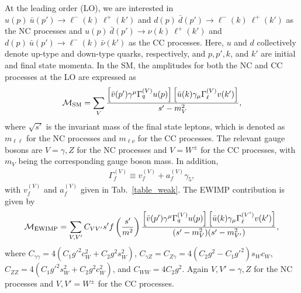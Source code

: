 \documentclass[12pt,twoside,book]{article}
\begin{document}
At the leading order (LO), we are interested in $u(p)~\bar{u}(p') \to
\ell^{-}(k)~\ell^{+}(k')$ and $d(p)~\bar{d}(p') \to
\ell^{-}(k)~\ell^{+}(k')$ as the NC processes and $u(p)~\bar{d}(p')
\to \nu(k)~\ell^{+}(k')$ and $d(p)~\bar{u}(p') \to
\ell^{-}(k)~\bar{\nu}(k')$ as the CC processes.  Here, $u$ and $d$
collectively denote up-type and down-type quarks, respectively, and
$p, p', k$, and $k'$ are initial and final state momenta.  In the SM,
the amplitudes for both the NC and CC processes at the LO are
expressed as
\begin{align}
 \mathcal{M}_{\rm SM} = \sum_{V} \frac{\left[ \bar{v}(p')
 \gamma^\mu \Gamma_q^{(V)} u(p) \right] \left[ \bar{u}(k) \gamma_\mu
 \Gamma_{\ell}^{(V)} v(k') \right]}{s' - m_V^2},\label{eq_m_sm}
\end{align}
where $\sqrt{s'}$ is the invariant mass of the final state leptons,
which is denoted as $m_{\ell\ell}$ for the NC processes and
$m_{\ell\nu}$ for the CC processes.  The relevant gauge bosons are $V
= \gamma, Z$ for the NC processes and $V = W^\pm$ for the CC
processes, with $m_V$ being the corresponding gauge boson mass. In addition,
\begin{align}
  \Gamma_f^{(V)} \equiv v_f^{(V)} + a_f^{(V)} \gamma_5,
\end{align}
with $v_f^{(V)}$ and $a_f^{(V)}$ given in Tab.~\ref{table_weak}.
The EWIMP contribution is given by
\begin{align}
 \mathcal{M}_{\rm EWIMP} = \sum_{V,V'} C_{VV'} s' f\left(\frac{s'}{m^2}\right)
 \frac{\left[ \bar{v}(p') \gamma^\mu \Gamma_q^{(V)} u(p) \right]
 \left[ \bar{u}(k) \gamma_\mu \Gamma_\ell^{(V')} v(k') \right]}
 {(s'-m_V^2)(s'-m_{V'}^2)},\label{eq_m_ewimp}
\end{align}
where $C_{\gamma \gamma} = 4(C_1 g'^2 c_W^2 + C_2 g^2 s_W^2)$,
$C_{\gamma Z} = C_{Z \gamma} = 4(C_2 g^2 - C_1 g'^2) s_W c_W$, $C_{Z
  Z} = 4(C_1 g'^2 s_W^2 + C_2 g^2 c_W^2)$, and $C_{WW} = 4 C_2 g^2$.
Again $V, V' = \gamma, Z$ for the NC processes and $V, V' = W^\pm$ for
the CC processes.
\end{document}
